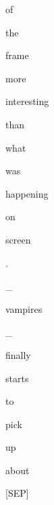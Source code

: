 \documentclass[varwidth=150mm]{standalone}
\begin{document}
\begin{CJK*}{UTF8}{gbsn}
{{{\colorbox{red!0.0}{\strut of} \colorbox{red!0.0}{\strut the} \colorbox{red!0.0}{\strut frame} \colorbox{red!0.0}{\strut more} \colorbox{red!0.0}{\strut interesting} \colorbox{red!0.0}{\strut than} \colorbox{red!2.597123622894287}{\strut what} \colorbox{red!6.588685989379883}{\strut was} \colorbox{red!0.0}{\strut happening} \colorbox{red!0.0}{\strut on} \colorbox{red!3.304699659347534}{\strut screen} \colorbox{red!0.0}{\strut .} \colorbox{red!16.686275482177734}{\strut \_} \colorbox{red!26.764862060546875}{\strut vampires} \colorbox{red!20.593116760253906}{\strut \_} \colorbox{red!1.868038535118103}{\strut finally} \colorbox{red!0.0}{\strut starts} \colorbox{red!4.474671840667725}{\strut to} \colorbox{red!0.0}{\strut pick} \colorbox{red!1.5856460332870483}{\strut up} \colorbox{red!16.439767837524414}{\strut about} \colorbox{red!12.90488338470459}{\strut [SEP]}
}}}
\end{CJK*}
\end{document}
